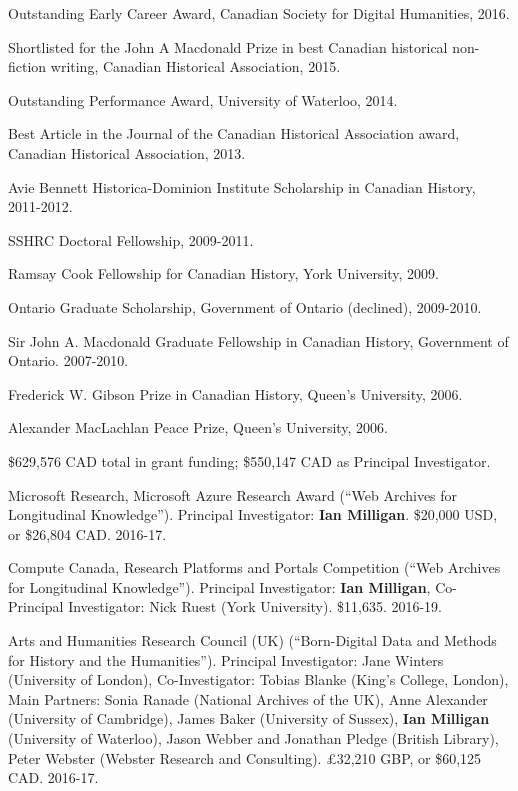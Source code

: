 \documentclass[11pt,article,oneside]{memoir}
\begin{document}
\ind Outstanding Early Career Award, Canadian Society for Digital Humanities, 2016.

\ind Shortlisted for the John A Macdonald Prize in best Canadian historical non-fiction writing, Canadian Historical Association, 2015.

\ind Outstanding Performance Award, University of Waterloo, 2014.

\ind Best Article in the Journal of the Canadian Historical Association award, Canadian Historical Association, 2013.

\ind Avie Bennett Historica-Dominion Institute Scholarship in Canadian History, 2011-2012.

\ind SSHRC Doctoral Fellowship, 2009-2011.

\ind Ramsay Cook Fellowship for Canadian History, York University, 2009.

\ind Ontario Graduate Scholarship, Government of Ontario (declined), 2009-2010.

\ind Sir John A. Macdonald Graduate Fellowship in Canadian History, Government of Ontario. 2007-2010.

\ind Frederick W. Gibson Prize in Canadian History, Queen's University, 2006.

\ind Alexander MacLachlan Peace Prize, Queen's University, 2006.
\bigskip 

\medskip

\ind \$629,576 CAD total in grant funding; \$550,147 CAD as Principal Investigator.

\medskip

\ind Microsoft Research, Microsoft Azure Research Award (``Web Archives for Longitudinal Knowledge''). Principal Investigator: \textbf{Ian Milligan}. \$20,000 USD, or \$26,804 CAD. 2016-17.

\ind Compute Canada, Research Platforms and Portals Competition (``Web Archives for Longitudinal Knowledge''). Principal Investigator: \textbf{Ian Milligan}, Co-Principal Investigator: Nick Ruest (York University). \$11,635. 2016-19.

\ind Arts and Humanities Research Council (UK) (``Born-Digital Data and Methods for History and the Humanities'').  Principal Investigator: Jane Winters (University of London), Co-Investigator: Tobias Blanke (King's College, London), Main Partners: Sonia Ranade (National Archives of the UK), Anne Alexander (University of Cambridge), James Baker (University of Sussex), \textbf{Ian Milligan} (University of Waterloo), Jason Webber and Jonathan Pledge (British Library), Peter Webster (Webster Research and Consulting). £32,210 GBP, or \$60,125 CAD. 2016-17.
\end{document}
